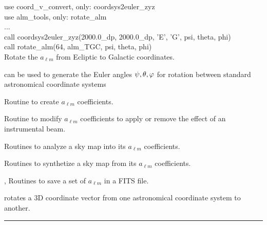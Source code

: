 \begin{example}
{
use coord\_v\_convert, only: coordsys2euler\_zyz \\
use alm\_tools, only: rotate\_alm \\
...\\
call coordsys2euler\_zyz(2000.0\_dp, 2000.0\_dp, 'E', 'G', psi, theta, phi) \\
call rotate\_alm(64, alm\_TGC, psi, theta, phi)  \\
}
{
Rotate the $a_{\ell m}$ from Ecliptic to Galactic coordinates.
}
\end{example}


\begin{related}
  \begin{sulist}{} %
  \item[\htmlref{coordsys2euler\_zyz}{sub:coordsys2euler_zyz}] can be used to generate
the Euler angles $\psi, \theta, \varphi $ for rotation between standard astronomical coordinate systems
  \item[\htmlref{create\_alm}{sub:create_alm}] Routine to create $a_{\ell m}$ coefficients.
  \item[\htmlref{alter\_alm}{sub:alter_alm}] Routine to modify $a_{\ell m}$
  coefficients to apply or remove the effect of an instrumental beam.
  \item[\htmlref{map2alm}{sub:map2alm}]  Routines to analyze a \healpix sky map into its $a_{\ell m}$
  coefficients.
  \item[\htmlref{alm2map}{sub:alm2map}] Routines to synthetize a \healpix sky map from its $a_{\ell m}$
  coefficients.
  \item[\htmlref{alms2fits}{sub:alms2fits}, \htmlref{dump\_alms}{sub:dump_alms}]
  Routines to save a set of $a_{\ell m}$ in a FITS file.  
  \item[\htmlref{xcc\_v\_convert}{sub:xcc_v_convert}] rotates a 3D coordinate
vector from one astronomical coordinate system to another.
  \end{sulist}
\end{related}

\rule{\hsize}{2mm}

\newpage
